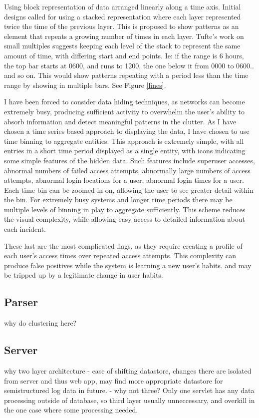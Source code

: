 Using block representation of data arranged linearly along a time axis.
Initial designs called for using a stacked representation where each layer represented twice the time of the previous layer.
This is proposed to show patterns as an element that repeats a growing number of times in each layer.
Tufte's work on small multiples \cite{tufte1983visual} suggests keeping each level of the stack to represent the same amount of time, with differing start and end points. Ie: if the range is 6 hours, the top bar starts at 0600, and runs to 1200, the one below it from 0000 to 0600..  and so on. This would show patterns repeating with a period less than the time range by showing in multiple bars. See Figure \ref{lines}.

I have been forced to consider data hiding techniques, as networks can become extremely busy, producing sufficient activity to overwhelm the user's ability to absorb information and detect meaningful patterns in the clutter. As I have chosen a time series based approach to displaying the data, I have chosen to use time binning to aggregate entities. This approach is extremely simple, with all entries in a short time period displayed as a single entity, with icons indicating some simple features of the hidden data. Such features include superuser accesses, abnormal numbers of failed access attempts, abnormally large numbers of access attempts, abnormal login locations for a user, abnormal login times for a user. Each time bin can be zoomed in on, allowing the user to see greater detail within the bin. For extremely busy systems and longer time periods there may be multiple levels of binning in play to aggregate sufficiently. This scheme reduces the visual complexity, while allowing easy access to detailed information about each incident. 

These last are the most complicated flags, as they require creating a profile of each user's access times over repeated access attempts. This complexity can produce false positives while the system is learning a new user's habits. and may be tripped up by a legitimate change in user habits.

\subsection{Parser}
why do clustering here?

\subsection{Server}
why two layer architecture - ease of shifting datastore, changes there are isolated from server and thus web app, may find more appropriate datastore for semistructured log data in future. - why not three?
Only one servlet has any data processing outside of database, so third layer usually unneccessary, and overkill in the one case where some processing needed.

